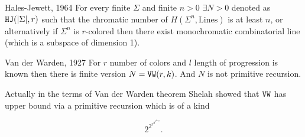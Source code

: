 \begin{thm}{Hales-Jewett, 1964}
	For every finite $\Sigma$ and finite $n > 0$ $\exists N > 0$ denoted as $\mathtt{HJ} (|\Sigma|, r)$ such that the chromatic number of $H(\Sigma^n, \text{Lines})$ is at least $n$, or alternatively if $\Sigma^n$ is $r$-colored then there exist monochromatic combinatorial line (which is a subspace of dimension 1).
\end{thm}

\begin{thm}{Van der Warden, 1927}
	For $r$ number of colors and $l$ length of progression is known then there is finite version $N = \mathtt{VW}(r,k)$. And $N$ is not primitive recursion.
\end{thm}

Actually in the terms of Van der Warden theorem Shelah showed that $\mathtt{VW}$ has upper bound via a primitive recursion which is of a kind

$$
2^{2^{r^{2^{2^{k+q}}}}}.
$$

\newpage

